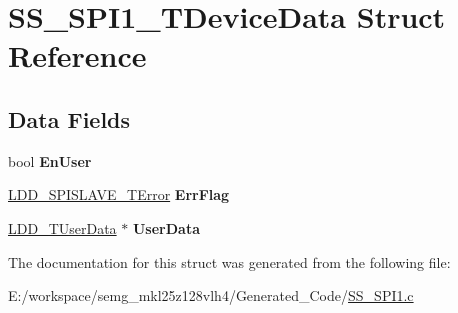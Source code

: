 \hypertarget{struct_s_s___s_p_i1___t_device_data}{\section{S\-S\-\_\-\-S\-P\-I1\-\_\-\-T\-Device\-Data Struct Reference}
\label{struct_s_s___s_p_i1___t_device_data}
}
\subsection*{Data Fields}
\begin{DoxyCompactItemize}
\item 
\hypertarget{struct_s_s___s_p_i1___t_device_data_a12252dfb829064813a7c1f898885e639}{bool {\bfseries En\-User}}\label{struct_s_s___s_p_i1___t_device_data_a12252dfb829064813a7c1f898885e639}

\item 
\hypertarget{struct_s_s___s_p_i1___t_device_data_aa1220f043d8f42b6c1ed47b88b607f3f}{\hyperlink{group___p_e___types__module_gad598e5539dcca7226409e24540dd2c62}{L\-D\-D\-\_\-\-S\-P\-I\-S\-L\-A\-V\-E\-\_\-\-T\-Error} {\bfseries Err\-Flag}}\label{struct_s_s___s_p_i1___t_device_data_aa1220f043d8f42b6c1ed47b88b607f3f}

\item 
\hypertarget{struct_s_s___s_p_i1___t_device_data_a5a5b544b1c248b61e2d5277e186aa417}{\hyperlink{group___p_e___types__module_ga0b66a73f87238a782318aa0be7578e35}{L\-D\-D\-\_\-\-T\-User\-Data} $\ast$ {\bfseries User\-Data}}\label{struct_s_s___s_p_i1___t_device_data_a5a5b544b1c248b61e2d5277e186aa417}

\end{DoxyCompactItemize}


The documentation for this struct was generated from the following file\-:\begin{DoxyCompactItemize}
\item 
E\-:/workspace/semg\-\_\-mkl25z128vlh4/\-Generated\-\_\-\-Code/\hyperlink{_s_s___s_p_i1_8c}{S\-S\-\_\-\-S\-P\-I1.\-c}\end{DoxyCompactItemize}
